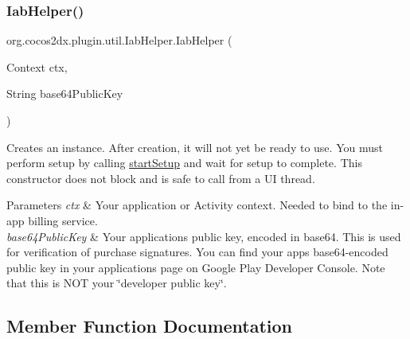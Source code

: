 \subsubsection{\texorpdfstring{Iab\+Helper()}{IabHelper()}}
{\footnotesize\ttfamily org.\+cocos2dx.\+plugin.\+util.\+Iab\+Helper.\+Iab\+Helper (\begin{DoxyParamCaption}\item[{Context}]{ctx,  }\item[{String}]{base64\+Public\+Key }\end{DoxyParamCaption})\hspace{0.3cm}{\ttfamily [inline]}}

Creates an instance. After creation, it will not yet be ready to use. You must perform setup by calling \hyperlink{classorg_1_1cocos2dx_1_1plugin_1_1util_1_1IabHelper_a4eb405a91ab5d6d6bb94a69ac0c54ec3}{start\+Setup} and wait for setup to complete. This constructor does not block and is safe to call from a UI thread.


\begin{DoxyParams}{Parameters}
{\em ctx} & Your application or Activity context. Needed to bind to the in-\/app billing service. \\
\hline
{\em base64\+Public\+Key} & Your application\textquotesingle{}s public key, encoded in base64. This is used for verification of purchase signatures. You can find your app\textquotesingle{}s base64-\/encoded public key in your application\textquotesingle{}s page on Google Play Developer Console. Note that this is N\+OT your \char`\"{}developer public key\char`\"{}. \\
\hline
\end{DoxyParams}


\subsection{Member Function Documentation}
\mbox{\label{classorg_1_1cocos2dx_1_1plugin_1_1util_1_1IabHelper_aebe7d5a554683f1d09ef7bdc19d6046e}} 
